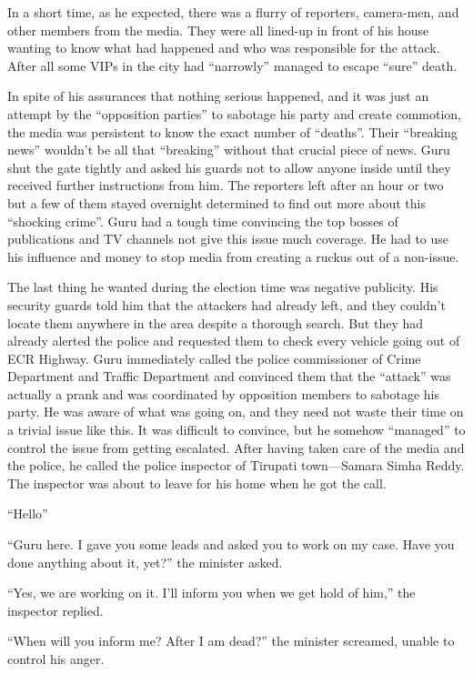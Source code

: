In a short time, as he expected, there was a flurry of reporters, camera-men,
and other members from the media. They were all lined-up in front of his house
wanting to know what had happened and who was responsible for the attack. After
all some VIPs in the city had “narrowly” managed to escape “sure” death.

In spite of his assurances that nothing serious happened, and it was just an
attempt by the “opposition parties” to sabotage his party and create commotion,
the media was persistent to know the exact number of “deaths”. Their “breaking
news” wouldn't be all that “breaking” without that crucial piece of news. Guru
shut the gate tightly and asked his guards not to allow anyone inside until they
received further instructions from him. The reporters left after an hour or two
but a few of them stayed overnight determined to find out more about this
“shocking crime”. Guru had a tough time convincing the top bosses of
publications and TV channels not give this issue much coverage. He had to use
his influence and money to stop media from creating a ruckus out of a non-issue.

The last thing he wanted during the election time was negative publicity. His
security guards told him that the attackers had already left, and they couldn't
locate them anywhere in the area despite a thorough search. But they had already
alerted the police and requested them to check every vehicle going out of ECR
Highway. Guru immediately called the police commissioner of Crime Department and
Traffic Department and convinced them that the “attack” was actually a prank and
was coordinated by opposition members to sabotage his party. He was aware of
what was going on, and they need not waste their time on a trivial issue like
this. It was difficult to convince, but he somehow “managed” to control the
issue from getting escalated.
After having taken care of the media and the police, he called the police
inspector of Tirupati town—Samara Simha Reddy. The inspector was about to
leave for his home when he got the call.

“Hello”

“Guru here. I gave you some leads and asked you to work on my case. Have you
done anything about it, yet?” the minister asked.

“Yes, we are working on it. I'll inform you when we get hold of him,” the
inspector replied.

“When will you inform me? After I am dead?” the minister screamed, unable to
control his anger.

